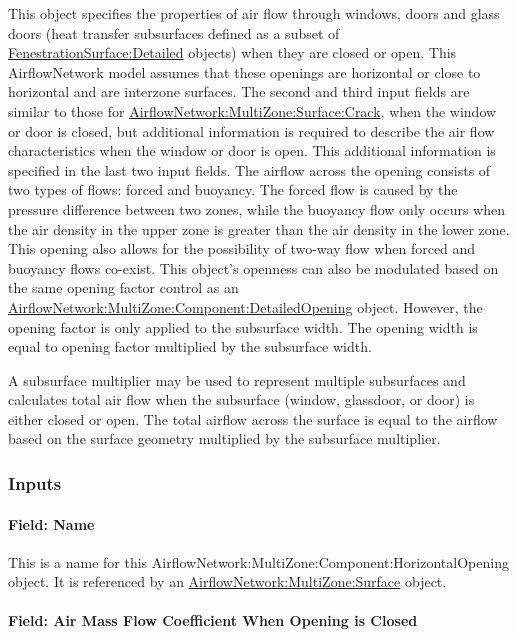 This object specifies the properties of air flow through windows, doors and glass doors (heat transfer subsurfaces defined as a subset of \hyperref[fenestrationsurfacedetailed]{FenestrationSurface:Detailed} objects) when they are closed or open. This AirflowNetwork model assumes that these openings are horizontal or close to horizontal and are interzone surfaces. The second and third input fields are similar to those for \hyperref[airflownetworkmultizonesurfacecrack]{AirflowNetwork:MultiZone:Surface:Crack}, when the window or door is closed, but additional information is required to describe the air flow characteristics when the window or door is open. This additional information is specified in the last two input fields. The airflow across the opening consists of two types of flows: forced and buoyancy. The forced flow is caused by the pressure difference between two zones, while the buoyancy flow only occurs when the air density in the upper zone is greater than the air density in the lower zone. This opening also allows for the possibility of two-way flow when forced and buoyancy flows co-exist. This object's openness can also be modulated based on the same opening factor control as an \hyperref[airflownetworkmultizonecomponentdetailedopening]{AirflowNetwork:MultiZone:Component:DetailedOpening} object. However, the opening factor is only applied to the subsurface width. The opening width is equal to opening factor multiplied by the subsurface width.

A subsurface multiplier may be used to represent multiple subsurfaces and calculates total air flow when the subsurface (window, glassdoor, or door) is either closed or open. The total airflow across the surface is equal to the airflow based on the surface geometry multiplied by the subsurface multiplier.

\subsubsection{Inputs}\label{inputs-5-003}

\paragraph{Field: Name}\label{field-name-5-003}

This is a name for this AirflowNetwork:MultiZone:Component:HorizontalOpening object. It is referenced by an \hyperref[airflownetworkmultizonesurface]{AirflowNetwork:MultiZone:Surface} object.

\paragraph{Field: Air Mass Flow Coefficient When Opening is Closed}\label{field-air-mass-flow-coefficient-when-opening-is-closed-1}

